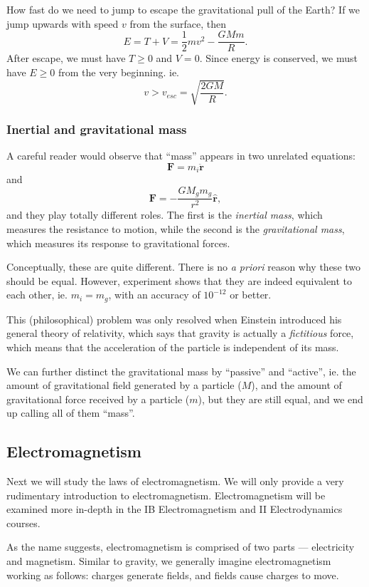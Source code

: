 \documentclass[a4paper]{article}
\begin{document}
\begin{eg}
  How fast do we need to jump to escape the gravitational pull of the Earth? If we jump upwards with speed $v$ from the surface, then
  \[
    E = T + V = \frac{1}{2}mv^2 - \frac{GMm}{R}.
  \]
  After escape, we must have $T \geq 0$ and $V = 0$. Since energy is conserved, we must have $E \geq 0$ from the very beginning. ie.
  \[
    v > v_{esc} = \sqrt{\frac{2GM}{R}}.
  \]
\end{eg}
\subsubsection*{Inertial and gravitational mass}
A careful reader would observe that ``mass'' appears in two unrelated equations:
\[
  \mathbf{F} = m_i\ddot{\mathbf{r}}
\]
and
\[
  \mathbf{F} = -\frac{GM_gm_g}{r^2}\hat{\mathbf{r}},
\]
and they play totally different roles. The first is the \emph{inertial mass}, which measures the resistance to motion, while the second is the \emph{gravitational mass}, which measures its response to gravitational forces.

Conceptually, these are quite different. There is no \emph{a priori} reason why these two should be equal. However, experiment shows that they are indeed equivalent to each other, ie. $m_i = m_g$, with an accuracy of $10^{-12}$ or better.

This (philosophical) problem was only resolved when Einstein introduced his general theory of relativity, which says that gravity is actually a \emph{fictitious} force, which means that the acceleration of the particle is independent of its mass.

We can further distinct the gravitational mass by ``passive'' and ``active'', ie. the amount of gravitational field generated by a particle ($M$), and the amount of gravitational force received by a particle ($m$), but they are still equal, and we end up calling all of them ``mass''.
\subsection{Electromagnetism}
Next we will study the laws of electromagnetism. We will only provide a very rudimentary introduction to electromagnetism. Electromagnetism will be examined more in-depth in the IB Electromagnetism and II Electrodynamics courses.

As the name suggests, electromagnetism is comprised of two parts --- electricity and magnetism. Similar to gravity, we generally imagine electromagnetism working as follows: charges generate fields, and fields cause charges to move.
\end{document}
